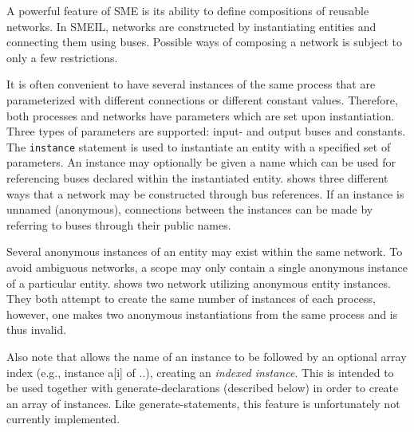 A powerful feature of SME is its ability to define compositions of reusable
networks. In SMEIL, networks are constructed by instantiating entities and
connecting them using buses. Possible ways of composing a network is subject to
only a few restrictions.

It is often convenient to have several instances of the same process that are
parameterized with different connections or different constant
values. Therefore, both processes and networks have parameters which are set
upon instantiation. Three types of parameters are supported: input- and output
buses and constants. The {\tt instance} statement is used to instantiate an
entity with a specified set of parameters. An instance may optionally be given a
name which can be used for referencing buses declared within the instantiated
entity.  shows three different ways that a network may be
constructed through bus references. If an instance is unnamed (anonymous),
connections between the instances can be made by referring to buses through
their public names.

Several anonymous instances of an entity may exist within the same network. To
avoid ambiguous networks, a scope may only contain a single anonymous instance
of a particular entity.   shows two network utilizing
anonymous entity instances. They both attempt to create the same number of
instances of each process, however, one makes two anonymous instantiations from
the same process and is thus invalid.

Also note that {\itshape <instance-name>} allows the name of an instance to be
followed by an optional array index (e.g., {\ttfamily instance a[i] of ..}),
creating an {\itshape indexed instance}. This is intended to be used together
with {\ttfamily generate}-declarations (described below) in order to create an
array of instances. Like {\ttfamily generate}-statements, this feature is
unfortunately not currently implemented.

